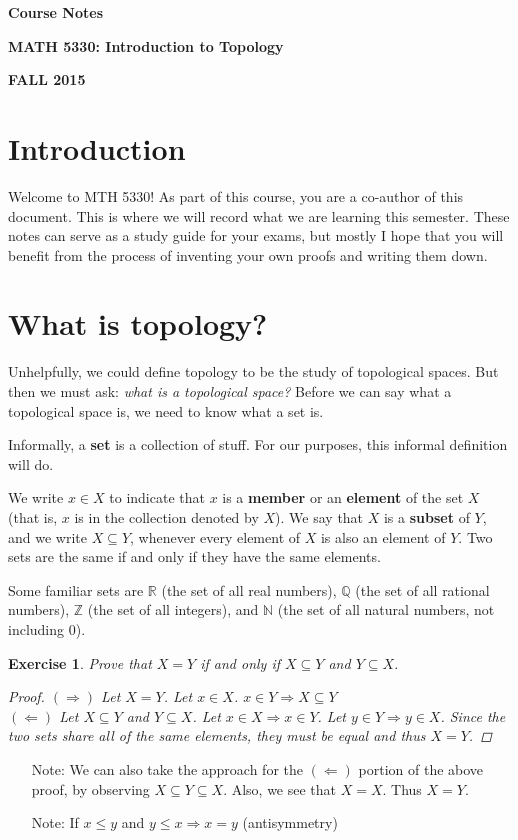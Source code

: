 \documentclass[12pt]{amsart}
\newtheorem{exercise}{Exercise}[section]
\theoremstyle{definition}
\theoremstyle{remark}
\newcommand{\Q}{\mathbb{Q}}
\newcommand{\R}{\mathbb{R}}
\newcommand{\N}{\mathbb{N}}
\newcommand{\Z}{\mathbb{Z}}
\newcommand{\0}{\emptyset}
\begin{document}
\begin{center}
\Large{\textbf{Course Notes}}

\large{\textbf{MATH 5330: Introduction to Topology}}

\large{\textbf{FALL 2015}}
\end{center}

\section{Introduction}

Welcome to MTH 5330! As part of this course, you are a co-author of this document. This is where we will record what we are learning this semester. These notes can serve as a study guide for your exams, but mostly I hope that you will benefit from the process of inventing your own proofs and writing them down.

\section{What is topology?}

Unhelpfully, we could define topology to be the study of topological spaces. But then we must ask: \textit{what is a topological space?} Before we can say what a topological space is, we need to know what a set is.

Informally, a \textbf{set} is a collection of stuff. For our purposes, this informal definition will do.

We write $x \in X$ to indicate that $x$ is a \textbf{member} or an \textbf{element} of the set $X$ (that is, $x$ is in the collection denoted by $X$). We say that $X$ is a \textbf{subset} of $Y$, and we write $X \subseteq Y$, whenever every element of $X$ is also an element of $Y$. Two sets are the same if and only if they have the same elements.

Some familiar sets are $\R$ (the set of all real numbers), $\Q$ (the set of all rational numbers), $\Z$ (the set of all integers), and $\N$ (the set of all natural numbers, not including $0$).

\begin{exercise}
Prove that $X = Y$ if and only if $X \subseteq Y$ and $Y \subseteq X$.
\begin{proof}
	$(\Rightarrow)$ Let $X=Y$. Let $x \in X$. $x \in Y \Rightarrow X \subseteq Y$
	\\$(\Leftarrow)$ Let $X \subseteq Y$ and $Y \subseteq X$. Let $x \in X \Rightarrow x \in Y$. Let $y \in Y \Rightarrow y \in X$. Since the two sets share all of the same elements, they must be equal and thus $X = Y$.
\end{proof}
\end{exercise}
\begin{itemize}
	\item[Note:] We can also take the approach for the $(\Leftarrow)$ portion of the above proof, by observing $X \subseteq Y \subseteq X$. Also, we see that $X = X$. Thus $X = Y$.
	\item[Note:] If $x \leq y$ and $y \leq x \Rightarrow x=y$ (antisymmetry)
\end{itemize}
\end{document}
